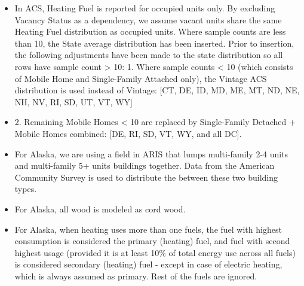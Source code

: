 \begin{itemize}
\item In ACS, Heating Fuel is reported for occupied units only. By excluding Vacancy Status as a dependency, we assume vacant units share the same Heating Fuel distribution as occupied units. Where sample counts are less than 10, the State average distribution has been inserted. Prior to insertion, the following adjustments have been made to the state distribution so all rows have sample count > 10: 1. Where sample counts < 10 (which consists of Mobile Home and Single-Family Attached only), the Vintage ACS distribution is used instead of Vintage: [CT, DE, ID, MD, ME, MT, ND, NE, NH, NV, RI, SD, UT, VT, WY]
\item 2. Remaining Mobile Homes < 10 are replaced by Single-Family Detached + Mobile Homes combined: [DE, RI, SD, VT, WY, and all DC].
\item For Alaska, we are using a field in ARIS that lumps multi-family 2-4 units and multi-family 5+ units buildings together. Data from the American Community Survey is used to distribute the between these two building types.
\item For Alaska, all wood is modeled as cord wood.
\item For Alaska, when heating uses more than one fuels, the fuel with highest consumption is considered the primary (heating) fuel, and fuel with second highest usage (provided it is at least 10\% of total energy use across all fuels) is considered secondary (heating) fuel - except in case of electric heating, which is always assumed as primary. Rest of the fuels are ignored.
\end{itemize}
